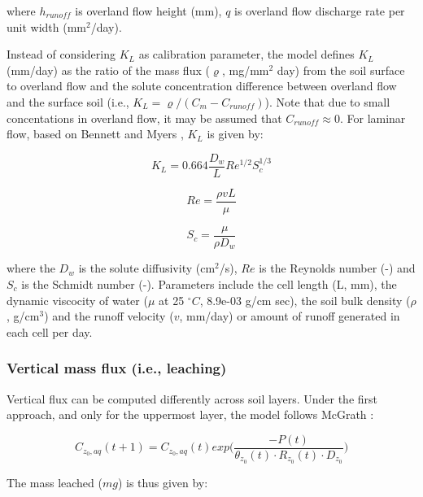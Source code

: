 \documentclass[]{article}
\begin{document}
where \(h_{runoff}\) is overland flow height (mm), \(q\) is overland
flow discharge rate per unit width (mm\(^2\)/day).

Instead of considering \(K_L\) as calibration parameter, the model
defines \(K_L\) (mm/day) as the ratio of the mass flux (\(\varrho\),
mg/mm\(^2\) day) from the soil surface to overland flow and the solute
concentration difference between overland flow and the surface soil
(i.e., \(K_L = \varrho /(C_m - C_{runoff})\)). Note that due to small
concentations in overland flow, it may be assumed that
\(C_{runoff} \approx 0\). For laminar flow, based on Bennett and Myers
\citeyearpar{Bennet1982}, \(K_L\) is given by:

\begin{equation}
K_L = 0.664 \frac{D_w}{L}Re^{1/2}S_c^{1/3}
\label{eq:K_L}
\end{equation}

\begin{equation}
Re = \frac{\rho v L}{\mu}
\label{eq:Re}
\end{equation}

\begin{equation}
S_c = \frac{ \mu}{\rho D_w}
\label{eq:S_c}
\end{equation}

where the \(D_w\) is the solute diffusivity (cm\(^2\)/s), \(Re\) is the
Reynolds number (-) and \(S_c\) is the Schmidt number (-). Parameters
include the cell length (L, mm), the dynamic viscocity of water (\(\mu\)
at 25 \(^\circ C\), 8.9e-03 g/cm sec), the soil bulk density (\(\rho\),
g/cm\(^3\)) and the runoff velocity (\(v\), mm/day) or amount of runoff
generated in each cell per day.

\subsubsection{Vertical mass flux (i.e.,
leaching)}\label{vertical-mass-flux-i.e.-leaching}

Vertical flux can be computed differently across soil layers. Under the
first approach, and only for the uppermost layer, the model follows
McGrath \citeyearpar{Mcgrath2008}:

\begin{equation}
C_{z_0,aq}(t+1) = C_{z_0,aq}(t) exp \Big( \frac{ -P(t) }{ \theta_{z_0}(t) \cdot R_{z_0}(t) \cdot D_{z_0} } \Big) 
\label{eq:conc_mcgrath}
\end{equation}

The mass leached (\(mg\)) is thus given by:
\end{document}
